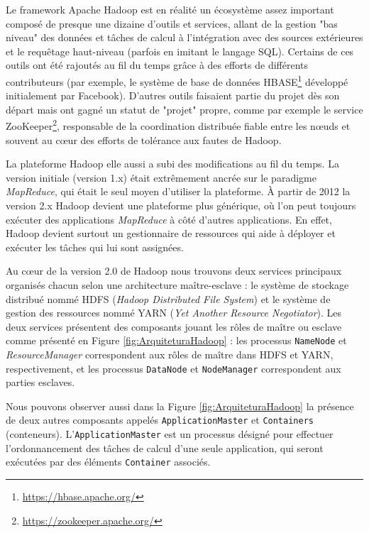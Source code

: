 Le framework Apache Hadoop est en réalité un écosystème assez important composé de presque une dizaine d'outils et services, allant de la gestion "bas niveau" des données et tâches de calcul à l'intégration avec des sources extérieures et le requêtage haut-niveau (parfois en imitant le langage SQL). Certains de ces outils ont été rajoutés au fil du temps grâce à des efforts de différents contributeurs (par exemple, le système de base de données HBASE\footnote{\url{https://hbase.apache.org/}} développé initialement par Facebook). D'autres outils faisaient partie du projet dès son départ mais ont gagné un statut de "projet" propre, comme par exemple le service ZooKeeper\footnote{\url{https://zookeeper.apache.org/}}, responsable de la coordination distribuée fiable entre les n{\oe}uds et souvent au c{\oe}ur des efforts de tolérance aux fautes de Hadoop.

La plateforme Hadoop elle aussi a subi des modifications au fil du temps. La version initiale (version 1.x) était extrêmement ancrée sur le paradigme \textit{MapReduce}, qui était le seul moyen d'utiliser la plateforme. À partir de 2012 la version 2.x Hadoop devient une plateforme plus générique, où l'on peut toujours exécuter des applications \textit{MapReduce} à côté d'autres applications. En effet, Hadoop devient surtout un gestionnaire de ressources qui aide à déployer et exécuter les tâches qui lui sont assignées.  

Au c{\oe}ur de la version 2.0 de Hadoop nous trouvons deux services principaux organisés chacun selon une architecture maître-esclave : le système de stockage distribué nommé HDFS (\textit{Hadoop Distributed File System}) et le système de gestion des ressources nommé YARN (\textit{Yet Another Resource Negotiator}). Les deux services présentent des composants jouant les rôles de maître ou esclave comme présenté en Figure \ref{fig:ArquiteturaHadoop} : les processus \texttt{NameNode} et \textit{ResourceManager} correspondent aux rôles de maître dans HDFS et YARN, respectivement, et les processus \texttt{DataNode} et \texttt{NodeManager} correspondent aux parties esclaves. 

Nous pouvons observer aussi dans la Figure \ref{fig:ArquiteturaHadoop} la présence de deux autres composants appelés \texttt{ApplicationMaster} et \texttt{Containers} (conteneurs). L'\texttt{ApplicationMaster} est un processus désigné pour effectuer l'ordonnancement des tâches de calcul d'une seule application, qui seront exécutées par des éléments \texttt{Container} associés.  


